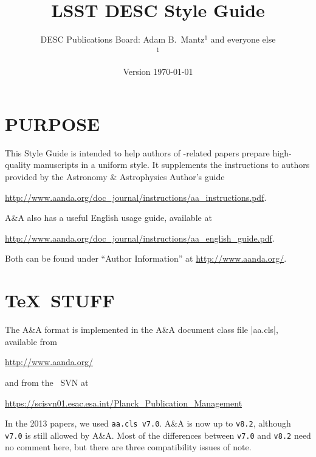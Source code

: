 \documentclass[letterpaper,11pt]{article}
\newcommand*{\version}{Version \today}
\begin{document}

\title{\vspace{5cm}LSST DESC Style Guide}
\author{DESC Publications Board: Adam B.\ Mantz$^1$ and everyone else
  \smallskip\\{\small
    $^1$\suphysics
}}
\date{\version}
\maketitle
\thispagestyle{fancy}

\clearpage
\fancyhead{}
\fancyhead[L]{\version}
\fancyhead[R]{\thepage}
\setcounter{page}{1}

\tableofcontents

\clearpage
\fancyhead[C]{\rightmark}
\setcounter{page}{1}

\section{PURPOSE}

This Style Guide is intended to help authors of \Planck-related papers prepare
high-quality manuscripts in a uniform style. It supplements the instructions
to authors provided by the  Astronomy \& Astrophysics Author's guide 

\url{http://www.aanda.org/doc_journal/instructions/aa_instructions.pdf}.

\noindent A\&A also has a useful English usage guide, available at 

\url{http://www.aanda.org/doc_journal/instructions/aa_english_guide.pdf}.

\noindent Both can be found under ``Author Information'' at
\url{http://www.aanda.org/}.


\section{\TeX\ STUFF}

The A\&A format is implemented in the A\&A document class file |aa.cls|,
available from 

\url{http://www.aanda.org/}

\noindent and from the \Planck\ SVN at

\url{https://scisvn01.esac.esa.int/Planck_Publication_Management}

\noindent In the 2013 papers, we used \verb|aa.cls v7.0|.  A\&A is now up to
\verb|v8.2|, although \verb|v7.0| is still allowed by A\&A.  Most of the differences between \verb|v7.0| and \verb|v8.2|
need no comment here, but there are three compatibility issues of note.
\end{document}
